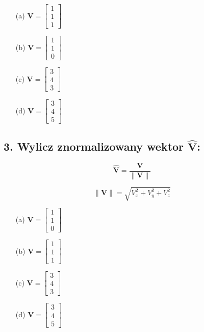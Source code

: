\begin{enumerate}
    \item[(a)] $\mathbf{V} = \begin{bmatrix} 1 \\ 1 \\ 1 \end{bmatrix}$
    
    \item[(b)] $\mathbf{V} = \begin{bmatrix} 1 \\ 1 \\ 0 \end{bmatrix}$
    
    \item[(c)] $\mathbf{V} = \begin{bmatrix} 3 \\ 4 \\ 3 \end{bmatrix}$
    
    \item[(d)] $\mathbf{V} = \begin{bmatrix} 3 \\ 4 \\ 5 \end{bmatrix}$
\end{enumerate}

\subsection*{3. Wylicz znormalizowany wektor $\hat{\mathbf{V}}$:}

\[
\hat{\mathbf{V}} = \frac{\mathbf{V}}{\|\mathbf{V}\|} 
\]

\[
\|\mathbf{V}\| = \sqrt{V_x^2 + V_y^2 + V_z^2}
\]


\begin{enumerate}
    \item[(a)] $\mathbf{V} = \begin{bmatrix} 1 \\ 1 \\ 0 \end{bmatrix}$
    
    \item[(b)] $\mathbf{V} = \begin{bmatrix} 1 \\ 1 \\ 1 \end{bmatrix}$
    
    \item[(c)] $\mathbf{V} = \begin{bmatrix} 3 \\ 4 \\ 3 \end{bmatrix}$
    
    \item[(d)] $\mathbf{V} = \begin{bmatrix} 3 \\ 4 \\ 5 \end{bmatrix}$
\end{enumerate}


